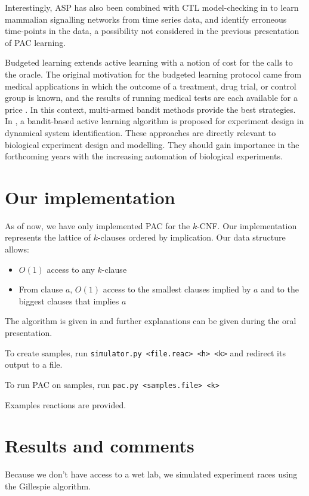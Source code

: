 \documentclass{llncs}
\begin{document}
Interestingly, ASP has also been combined with CTL model-checking in \cite{OPSSG16biosystems} to learn mammalian signalling networks from time series data, 
and identify erroneous time-points in the data, a possibility not considered in the previous presentation of PAC learning.


Budgeted learning extends active learning with a notion of cost for the calls to the oracle.
The original motivation for the budgeted learning protocol came from medical applications in which the outcome of a treatment,
drug trial, or control group is known, and the results of running medical tests are each available for a price \cite{DZBSM13ml}.
In this context, multi-armed bandit methods \cite{DBSSZ07icdm} provide the best strategies.
In \cite{LMALS14ecml}, a bandit-based active learning algorithm is proposed for experiment design in dynamical system identification.
These approaches are directly relevant to biological experiment design and modelling. %
They should gain importance in the forthcoming years with the increasing automation of biological experiments.




\section{Our implementation}
As of now, we have only implemented PAC for the $k$-CNF. Our implementation represents the lattice of $k$-clauses ordered by implication. Our data structure allows:
\begin{itemize}
	\item $O(1)$ access to any $k$-clause
	\item From clause $a$, $O(1)$ access to the smallest clauses implied by $a$ and to the biggest clauses that implies $a$
\end{itemize}

The algorithm is given in \cite{valiant} and further explanations can be given during the oral presentation.

To create samples, run \texttt{simulator.py~<file.reac>~<h>~<k>} and redirect its output to a file.

To run PAC on samples, run \texttt{pac.py~<samples.file>~<k>}

Examples reactions are provided.
\section{Results and comments}
Because we don't have access to a wet lab, we simulated experiment races using the Gillespie algorithm.
\end{document}
